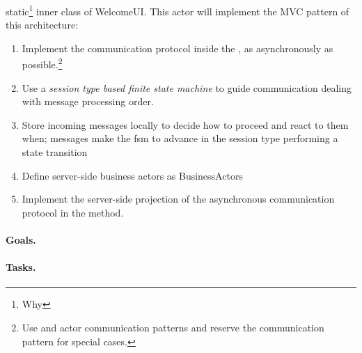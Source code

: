 \begin{enumerate}
\begin{enumerate}
    static\footnote{Why } inner class of WelcomeUI. This
    actor will implement the MVC pattern of this architecture:
    \begin{enumerate}
    \item Implement the communication protocol inside the
      , as asynchronously as possible.\footnote{Use
         and  actor communication patterns
        and reserve the  communication pattern for special
        cases.}
    \item Use a \emph{session type based finite state machine} to
      guide communication dealing with message processing order.
    \item Store incoming messages locally to decide how to proceed and
      react to them when; messages make the fsm to advance in the
      session type performing a state transition
    \item Define server-side business actors as BusinessActors
    \item Implement the server-side projection of the asynchronous
      communication protocol in the  method.
    \end{enumerate}
  \end{enumerate}
\end{enumerate}

\paragraph{Goals.}


\paragraph{Tasks.}






